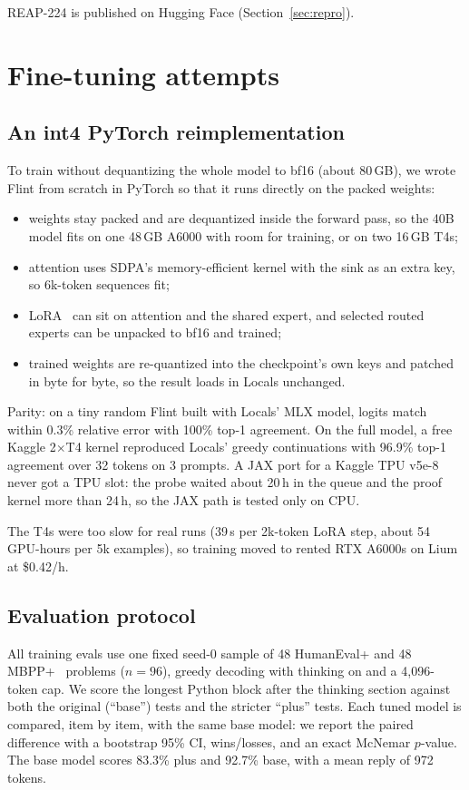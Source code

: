 \documentclass[11pt]{article}
\begin{document}
REAP-224 is published on Hugging Face (Section~\ref{sec:repro}).

\section{Fine-tuning attempts}
\label{sec:ft}

\subsection{An int4 PyTorch reimplementation}

To train without dequantizing the whole model to bf16 (about 80\,GB), we wrote Flint from scratch in PyTorch so that it runs directly on the packed weights:
\begin{itemize}
  \item weights stay packed and are dequantized inside the forward pass, so the 40B model fits on one 48\,GB A6000 with
        room for training, or on two 16\,GB T4s;
  \item attention uses SDPA's memory-efficient kernel with the sink as an extra key, so 6k-token sequences fit;
  \item LoRA~\citep{hu2021lora} can sit on attention and the shared expert, and selected routed experts can be unpacked
        to bf16 and trained;
  \item trained weights are re-quantized into the checkpoint's own keys and patched in byte for byte, so the result
        loads in Locals unchanged.
\end{itemize}
Parity: on a tiny random Flint built with Locals' MLX model, logits match within 0.3\% relative error with 100\% top-1
agreement. On the full model, a free Kaggle 2$\times$T4 kernel reproduced Locals' greedy continuations with 96.9\%
top-1 agreement over 32 tokens on 3 prompts. A JAX port for a Kaggle TPU v5e-8 never got a TPU slot: the probe waited
about 20\,h in the queue and the proof kernel more than 24\,h, so the JAX path is tested only on CPU.

The T4s were too slow for real runs (39\,s per 2k-token LoRA step, about 54 GPU-hours per 5k examples), so training moved
to rented RTX A6000s on Lium at \$0.42/h.

\subsection{Evaluation protocol}

All training evals use one fixed seed-0 sample of 48 HumanEval+ and 48 MBPP+~\citep{austin2021mbpp,liu2023evalplus}
problems ($n{=}96$), greedy decoding with thinking on and a 4,096-token cap. We score the longest Python block after the
thinking section against both the original (``base'') tests and the stricter ``plus'' tests. Each tuned model is
compared, item by item, with the same base model: we report the paired difference with a bootstrap 95\% CI,
wins/losses, and an exact McNemar $p$-value. The base model scores 83.3\% plus and 92.7\% base, with a mean reply of
972 tokens.
\end{document}

